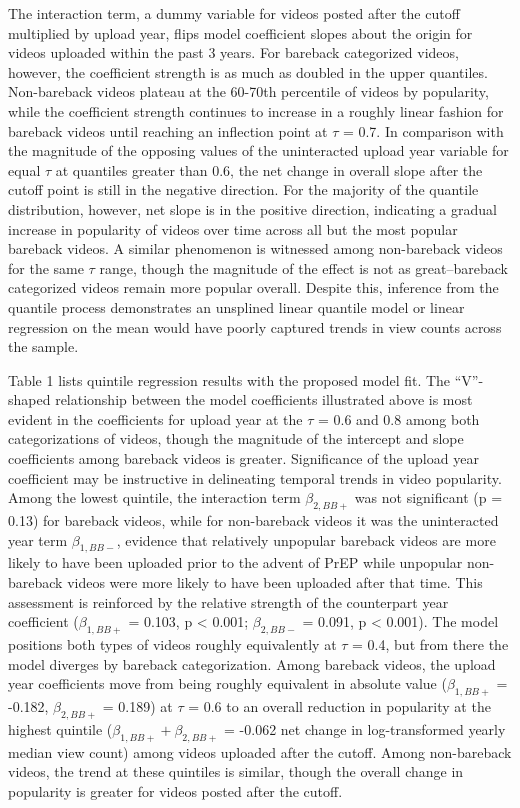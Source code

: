 \documentclass[]{article}
\begin{document}
The interaction term, a dummy variable for videos posted after the
cutoff multiplied by upload year, flips model coefficient slopes about
the origin for videos uploaded within the past 3 years. For bareback
categorized videos, however, the coefficient strength is as much as
doubled in the upper quantiles. Non-bareback videos plateau at the
60-70th percentile of videos by popularity, while the coefficient
strength continues to increase in a roughly linear fashion for bareback
videos until reaching an inflection point at \(\tau\) = 0.7. In
comparison with the magnitude of the opposing values of the uninteracted
upload year variable for equal \(\tau\) at quantiles greater than 0.6,
the net change in overall slope after the cutoff point is still in the
negative direction. For the majority of the quantile distribution,
however, net slope is in the positive direction, indicating a gradual
increase in popularity of videos over time across all but the most
popular bareback videos. A similar phenomenon is witnessed among
non-bareback videos for the same \(\tau\) range, though the magnitude of
the effect is not as great--bareback categorized videos remain more
popular overall. Despite this, inference from the quantile process
demonstrates an unsplined linear quantile model or linear regression on
the mean would have poorly captured trends in view counts across the
sample.

Table 1 lists quintile regression results with the proposed model fit.
The ``V''-shaped relationship between the model coefficients illustrated
above is most evident in the coefficients for upload year at the
\(\tau\) = 0.6 and 0.8 among both categorizations of videos, though the
magnitude of the intercept and slope coefficients among bareback videos
is greater. Significance of the upload year coefficient may be
instructive in delineating temporal trends in video popularity. Among
the lowest quintile, the interaction term \(\beta _{2, BB+}\) was not
significant (p = 0.13) for bareback videos, while for non-bareback
videos it was the uninteracted year term \(\beta _{1, BB-}\), evidence
that relatively unpopular bareback videos are more likely to have been
uploaded prior to the advent of PrEP while unpopular non-bareback videos
were more likely to have been uploaded after that time. This assessment
is reinforced by the relative strength of the counterpart year
coefficient (\(\beta _{1, BB+}\) = 0.103, p \textless{} 0.001;
\(\beta _{2, BB-}\) = 0.091, p \textless{} 0.001). The model positions
both types of videos roughly equivalently at \(\tau\) = 0.4, but from
there the model diverges by bareback categorization. Among bareback
videos, the upload year coefficients move from being roughly equivalent
in absolute value (\(\beta _{1, BB+}\) = -0.182, \(\beta _{2, BB+}\) =
0.189) at \(\tau\) = 0.6 to an overall reduction in popularity at the
highest quintile (\(\beta _{1, BB+} + \beta _{2, BB+}\) = -0.062 net
change in log-transformed yearly median view count) among videos
uploaded after the cutoff. Among non-bareback videos, the trend at these
quintiles is similar, though the overall change in popularity is greater
for videos posted after the cutoff.
\end{document}
